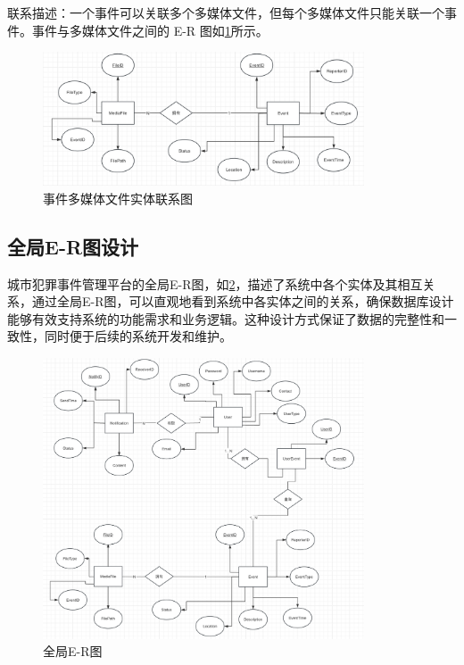 联系描述：一个事件可以关联多个多媒体文件，但每个多媒体文件只能关联一个事件。事件与多媒体文件之间的 E-R 图如\cref{fig:rela-event-mediafile}所示。

\begin{figure}[htbp]
    \centering
    \includegraphics[width=0.85\textwidth]{figures/db-img-rela-03.png}
    \caption{事件多媒体文件实体联系图}
    \label{fig:rela-event-mediafile}
\end{figure}



\subsection{全局E-R图设计}

城市犯罪事件管理平台的全局E-R图，如\cref{fig:rela-tot}，描述了系统中各个实体及其相互关系，通过全局E-R图，可以直观地看到系统中各实体之间的关系，确保数据库设计能够有效支持系统的功能需求和业务逻辑。这种设计方式保证了数据的完整性和一致性，同时便于后续的系统开发和维护。

\begin{figure}[htbp]
    \centering
    \includegraphics[width=0.85\textwidth]{figures/db-img-rela-tot.png}
    \caption{全局E-R图}
    \label{fig:rela-tot}
\end{figure}
